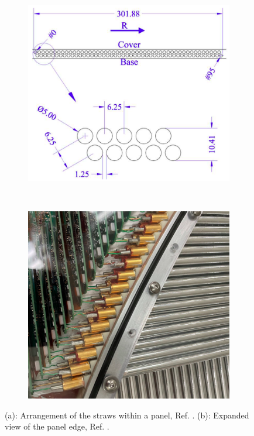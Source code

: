\begin{figure}[!h]
\begin{subfigure}[t]{0.5\textwidth}
    \centering
    \includegraphics[width =\textwidth]{figures/png/Screenshot_20240326_234405.png}
    \caption{}
    \label{fig:trktubes}
    \end{subfigure}
    ~
    \begin{subfigure}[t]{0.5\textwidth}
        \centering
        \includegraphics[width =\textwidth]{figures/png/Screenshot_20240327_000131.png}
        \caption{}
        \label{fig:strawtubes}
        \end{subfigure}
        \caption{(a): Arrangement of the straws within a panel, Ref. \cite{trk}. (b): Expanded view of the panel edge, Ref. \cite{trk}.}
    \end{figure}

